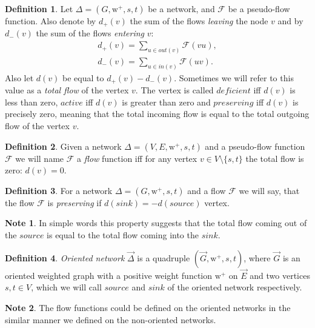 \documentclass[12pt]{article}
\theoremstyle{definition}
\newtheorem*{note}{Note}
\newtheorem{definition}{Definition}
\newcommand{\wtp}{\mathrm{w}^{+}}
\newcommand{\flow}{\mathcal{F}}
\newcommand{\source}{\mathit{source}}
\newcommand{\sink}{\mathit{sink}}
\newcommand{\ein}{in}
\newcommand{\eout}{out}
\newcommand{\net}{\Delta}
\newcommand{\onet}{\vec{\Delta}}
\numberwithin{remark}{section}
\numberwithin{theorem}{section}
\numberwithin{prop}{section}
\numberwithin{equation}{section}
\numberwithin{lemma}{section}
\numberwithin{prop_under_lemma}{lemma}
\begin{document}
    \begin{definition}
      Let $\net = (G, \wtp, s, t)$ be a network, and $\flow$ be a pseudo-flow function.
      Also denote by $d_{+}(v)$ the sum of the flows \emph{leaving} the node $v$ and by
      $d_{-}(v)$ the sum of the flows \emph{entering} $v$:
      \begin{align*}
          d_{+}(v) = \sum_{u \in \eout(v)} \flow(vu),\\
          d_{-}(v) = \sum_{u \in \ein(v)} \flow(uv).
      \end{align*}
      Also let $d(v)$ be equal to $d_{+}(v) - d_{-}(v)$. Sometimes we will refer to this value as
      a \emph{total flow} of the vertex $v$.
      The vertex is called $deficient$ iff $d(v)$ is less than zero,
      $active$ iff $d(v)$ is greater than zero and
      $preserving$ iff $d(v)$ is precisely zero, meaning that the total incoming flow
      is equal to the total outgoing flow of the vertex $v$.
    \end{definition}
    \begin{definition}
      Given a network $\net = (V, E, \wtp, s, t)$ and a pseudo-flow function $\flow$ we will name $\flow$ a
        \emph{flow} function iff for any vertex $v \in V \setminus \{s,t\}$ the total flow is zero: $d(v) = 0$.
    \end{definition}
    \begin{definition}
      For a network $\net = (G, \wtp, s, t)$ and a flow $\flow$ we will say,
      that the flow $\flow$ is \emph{preserving} if $d(\sink) = -d(\source)$ vertex.
    \end{definition}
    \begin{note}
      In simple words this property suggests
        that the total flow coming out of the $\source$ is equal to the total flow
        coming into the $\sink$.
    \end{note}
    \begin{definition}
      \emph{Oriented network} $\onet$ is a quadruple $(\vec{G}, \wtp, s, t)$, where
        $\vec{G}$ is an oriented weighted graph with 
        a positive weight function $\wtp$ on $\vec{E}$ and two vertices $s, t \in V$, which
        we will call $\source$ and $\sink$ of the oriented network respectively.
    \end{definition}
    \begin{note}
      The flow functions could be defined on the oriented networks in the similar manner
      we defined on the non-oriented networks.
    \end{note}
\end{document}
